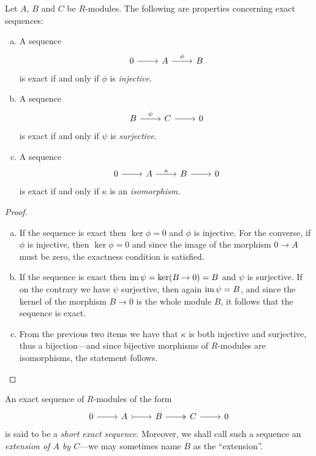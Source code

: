 \begin{proposition}
\label{prop:exact-sequence-properties-zero-maps}
Let \(A\), \(B\) and \(C\) be \(R\)-modules. The following are properties
concerning exact sequences:
\begin{enumerate}[(a)]\setlength\itemsep{0em}
\item A sequence
  \[
  \begin{tikzcd}
  0 \ar[r] &A \ar[r, "\phi"] &B
  \end{tikzcd}
  \]
  is exact if and only if \(\phi\) is \emph{injective}.
\item A sequence
  \[
  \begin{tikzcd}
  B \ar[r, "\psi"] & C \ar[r] &0
  \end{tikzcd}
  \]
  is exact if and only if \(\psi\) is \emph{surjective}.
\item A sequence
  \[
  \begin{tikzcd}
  0 \ar[r] &A \ar[r, "\kappa"] &B \ar[r] &0
  \end{tikzcd}
  \]
  is exact if and only if \(\kappa\) is an \emph{isomorphism}.
\end{enumerate}
\end{proposition}

\begin{proof}
\begin{enumerate}[(a)]\setlength\itemsep{0em}
\item If the sequence is exact then \(\ker \phi = 0\) and \(\phi\) is
  injective. For the converse, if \(\phi\) is injective, then \(\ker \phi = 0\)
  and since the image of the morphism \(0 \to A\) must be zero, the exactness
  condition is satisfied.
\item If the sequence is exact then \(\operatorname{im} \psi = \ker(B \to 0) = B\) and
  \(\psi\) is surjective. If on the contrary we have \(\psi\) surjective, then
  again \(\operatorname{im} \psi = B\), and since the kernel of the morphism \(B \to 0\) is
  the whole module \(B\), it follows that the sequence is exact.
\item From the previous two items we have that \(\kappa\) is both injective and
  surjective, thus a bijection---and since bijective morphisms of \(R\)-modules
  are isomorphisms, the statement follows.
\end{enumerate}
\end{proof}

\begin{definition}
\label{def:exact-sequence-module}
An exact sequence of \(R\)-modules of the form
\[
\begin{tikzcd}
0 \ar[r] &A \ar[r, tail] &B \ar[r, two heads] &C \ar[r] &0
\end{tikzcd}
\]
is said to be a \emph{short exact sequence}. Moreover, we shall call such a
sequence an \emph{extension of \(A\) by \(C\)}---we may sometimes name \(B\) as
the ``extension''.
\end{definition}

